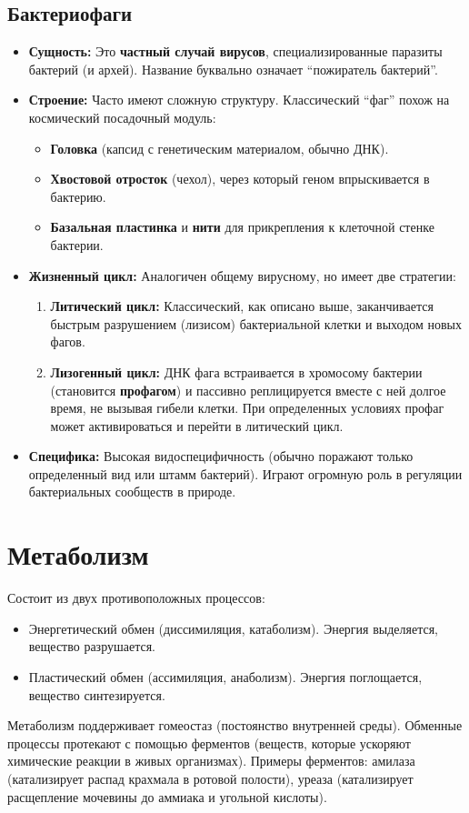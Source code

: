 \documentclass[12pt]{article}
\begin{document}
	\subsection{Бактериофаги}
	\begin{itemize}
		\item \textbf{Сущность:} Это \textbf{частный случай вирусов}, специализированные паразиты бактерий (и архей). Название буквально означает ``пожиратель бактерий''.
		\item \textbf{Строение:} Часто имеют сложную структуру. Классический ``фаг'' похож на космический посадочный модуль:
		\begin{itemize}
			\item \textbf{Головка} (капсид с генетическим материалом, обычно ДНК).
			\item \textbf{Хвостовой отросток} (чехол), через который геном впрыскивается в бактерию.
			\item \textbf{Базальная пластинка} и \textbf{нити} для прикрепления к клеточной стенке бактерии.
		\end{itemize}
		\item \textbf{Жизненный цикл:} Аналогичен общему вирусному, но имеет две стратегии:
		\begin{enumerate}
			\item \textbf{Литический цикл:} Классический, как описано выше, заканчивается быстрым разрушением (лизисом) бактериальной клетки и выходом новых фагов.
			\item \textbf{Лизогенный цикл:} ДНК фага встраивается в хромосому бактерии (становится \textbf{профагом}) и пассивно реплицируется вместе с ней долгое время, не вызывая гибели клетки. При определенных условиях профаг может активироваться и перейти в литический цикл.
		\end{enumerate}
		\item \textbf{Специфика:} Высокая видоспецифичность (обычно поражают только определенный вид или штамм бактерий). Играют огромную роль в регуляции бактериальных сообществ в природе.
	\end{itemize}
	\section{Метаболизм}
	Состоит из двух противоположных процессов:
	\begin{itemize}
		\item Энергетический обмен (диссимиляция, катаболизм). Энергия выделяется, вещество разрушается.
		\item Пластический обмен (ассимиляция, анаболизм). Энергия поглощается, вещество синтезируется.
	\end{itemize}
	Метаболизм поддерживает гомеостаз (постоянство внутренней среды). Обменные процессы протекают с помощью ферментов (веществ, которые ускоряют химические реакции в живых организмах). Примеры ферментов: амилаза (катализирует распад крахмала в ротовой полости), уреаза (катализирует расщепление мочевины до аммиака и угольной кислоты).
\end{document}

